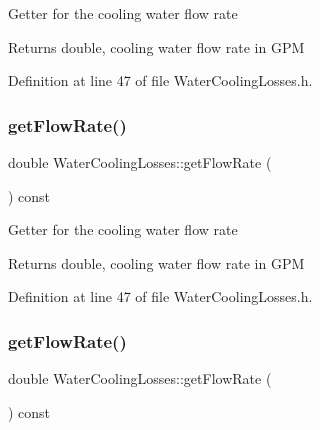 Getter for the cooling water flow rate \begin{DoxyReturn}{Returns}
double, cooling water flow rate in G\+PM 
\end{DoxyReturn}


Definition at line 47 of file Water\+Cooling\+Losses.\+h.

\mbox{\label{class_water_cooling_losses_a47f1b7d46f0e34ae898150a7c69e5f18}} 
\subsubsection{\texorpdfstring{get\+Flow\+Rate()}{getFlowRate()}\hspace{0.1cm}{\footnotesize\ttfamily [2/3]}}
{\footnotesize\ttfamily double Water\+Cooling\+Losses\+::get\+Flow\+Rate (\begin{DoxyParamCaption}{ }\end{DoxyParamCaption}) const\hspace{0.3cm}{\ttfamily [inline]}}

Getter for the cooling water flow rate \begin{DoxyReturn}{Returns}
double, cooling water flow rate in G\+PM 
\end{DoxyReturn}


Definition at line 47 of file Water\+Cooling\+Losses.\+h.

\mbox{\label{class_water_cooling_losses_a47f1b7d46f0e34ae898150a7c69e5f18}} 
\subsubsection{\texorpdfstring{get\+Flow\+Rate()}{getFlowRate()}\hspace{0.1cm}{\footnotesize\ttfamily [3/3]}}
{\footnotesize\ttfamily double Water\+Cooling\+Losses\+::get\+Flow\+Rate (\begin{DoxyParamCaption}{ }\end{DoxyParamCaption}) const\hspace{0.3cm}{\ttfamily [inline]}}

